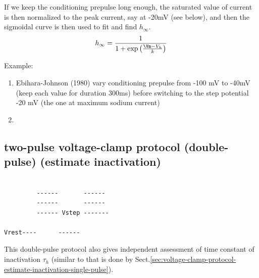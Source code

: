 If we keep the conditioning prepulse long enough, the saturated value of current
is then normalized to the peak current, say at -20mV (see below), and then the
sigmoidal curve is then used to fit and find $h_\infty$.
\begin{equation}
h_\infty = \frac{1}{1 + \exp\left( \frac{\Vm - V_h}{k} \right)}
\end{equation}

Example:
\begin{enumerate}
  \item Ebihara-Johnson (1980) vary conditioning prepulse from -100 mV to -40mV
  (keep each value for duration 300ms) before switching to the step potential
  -20 mV (the one at maximum sodium current)

  \item
\end{enumerate}

\subsection{two-pulse voltage-clamp protocol (double-pulse) (estimate
inactivation)}
\label{sec:voltage-clamp-protocol-estimate-inactivation-double-pulse}

\begin{verbatim}

         ------       ------
         ------       ------
         ------ Vstep -------

Vrest----      ------

\end{verbatim}

This double-pulse protocol also gives independent assessment of time constant of
inactivation $\tau_h$ (similar to that is done by
Sect.\ref{sec:voltage-clamp-protocol-estimate-inactivation-single-pulse}).


